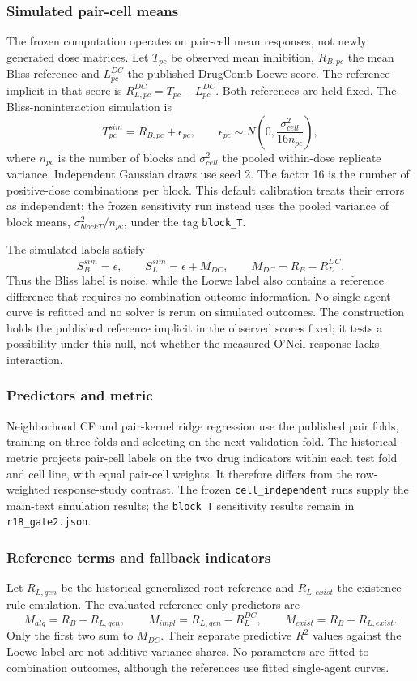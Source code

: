 \documentclass[11pt]{article}
\begin{document}
\subsubsection*{Simulated pair-cell means}
The frozen computation operates on pair-cell mean responses, not newly generated dose matrices. Let $T_{pc}$ be observed mean inhibition, $R_{B,pc}$ the mean Bliss reference and $L^{DC}_{pc}$ the published DrugComb Loewe score. The reference implicit in that score is $R^{DC}_{L,pc}=T_{pc}-L^{DC}_{pc}$. Both references are held fixed. The Bliss-noninteraction simulation is
\[
T^{sim}_{pc}=R_{B,pc}+\epsilon_{pc},\qquad
\epsilon_{pc}\sim N\!\left(0,\frac{\sigma^2_{cell}}{16n_{pc}}\right),
\]
where $n_{pc}$ is the number of blocks and $\sigma^2_{cell}$ the pooled within-dose replicate variance. Independent Gaussian draws use seed 2. The factor 16 is the number of positive-dose combinations per block. This default calibration treats their errors as independent; the frozen sensitivity run instead uses the pooled variance of block means, $\sigma^2_{blockT}/n_{pc}$, under the tag \texttt{block\_T}.

The simulated labels satisfy
\[
S^{sim}_B=\epsilon,\qquad
S^{sim}_L=\epsilon+M_{DC},\qquad
M_{DC}=R_B-R^{DC}_L.
\]
Thus the Bliss label is noise, while the Loewe label also contains a reference difference that requires no combination-outcome information. No single-agent curve is refitted and no solver is rerun on simulated outcomes. The construction holds the published reference implicit in the observed scores fixed; it tests a possibility under this null, not whether the measured O'Neil response lacks interaction.

\subsubsection*{Predictors and metric}
Neighborhood CF and pair-kernel ridge regression use the published pair folds, training on three folds and selecting on the next validation fold. The historical metric projects pair-cell labels on the two drug indicators within each test fold and cell line, with equal pair-cell weights. It therefore differs from the row-weighted response-study contrast. The frozen \texttt{cell\_independent} runs supply the main-text simulation results; the \texttt{block\_T} sensitivity results remain in \texttt{r18\_gate2.json}.

\subsubsection*{Reference terms and fallback indicators}
Let $R_{L,gen}$ be the historical generalized-root reference and $R_{L,exist}$ the existence-rule emulation. The evaluated reference-only predictors are
\[
M_{alg}=R_B-R_{L,gen},\qquad
M_{impl}=R_{L,gen}-R^{DC}_L,\qquad
M_{exist}=R_B-R_{L,exist}.
\]
Only the first two sum to $M_{DC}$. Their separate predictive $R^2$ values against the Loewe label are not additive variance shares. No parameters are fitted to combination outcomes, although the references use fitted single-agent curves.
\end{document}
